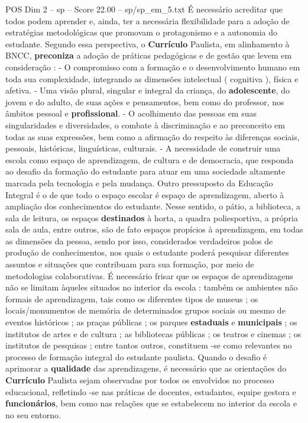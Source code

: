 \begin{textsample}{POS Dim 2 – sp – Score 22.00 – sp/sp\_em\_5.txt}
É necessário acreditar que todos podem aprender e, ainda, ter a necessária flexibilidade para a adoção de estratégias metodológicas que promovam o protagonismo e a autonomia do estudante.
Segundo essa perspectiva, o \textbf{Currículo} Paulista, em alinhamento à BNCC, \textbf{preconiza} a adoção de práticas pedagógicas e de gestão que levem em consideração : - O compromisso com a formação e o desenvolvimento humano em toda sua complexidade, integrando as dimensões intelectual ( cognitiva ), física e afetiva. - Uma visão plural, singular e integral da criança, do \textbf{adolescente}, do jovem e do adulto, de suas ações e pensamentos, bem como do professor, nos âmbitos pessoal e \textbf{profissional}. - O acolhimento das pessoas em suas singularidades e diversidades, o combate à discriminação e ao preconceito em todas as suas expressões, bem como a afirmação do respeito às diferenças sociais, pessoais, históricas, linguísticas, culturais. - A necessidade de construir uma escola como espaço de aprendizagem, de cultura e de democracia, que responda ao desafio da formação do estudante para atuar em uma sociedade altamente marcada pela tecnologia e pela mudança.
Outro pressuposto da Educação Integral é o de que todo o espaço escolar é espaço de aprendizagem, aberto à ampliação dos conhecimentos do estudante.
Nesse sentido, o pátio, a biblioteca, a sala de leitura, os espaços \textbf{destinados} à horta, a quadra poliesportiva, a própria sala de aula, entre outros, são de fato espaços propícios à aprendizagem, em todas as dimensões da pessoa, sendo por isso, considerados verdadeiros polos de produção de conhecimentos, nos quais o estudante poderá pesquisar diferentes assuntos e situações que contribuam para sua formação, por meio de metodologias colaborativas.
É necessário frisar que os espaços de aprendizagens não se limitam àqueles situados no interior da escola : também os ambientes não formais de aprendizagem, tais como os diferentes tipos de museus ; os locais/monumentos de memória de determinados grupos sociais ou mesmo de eventos históricos ; as praças públicas ; os parques \textbf{estaduais} e \textbf{municipais} ; os institutos de artes e de cultura ; as bibliotecas públicas ; os teatros e cinemas ; os institutos de pesquisas ; entre tantos outros, constituem -se como relevantes no processo de formação integral do estudante paulista.
Quando o desafio é aprimorar a \textbf{qualidade} das aprendizagens, é necessário que as orientações do \textbf{Currículo} Paulista sejam observadas por todos os envolvidos no processo educacional, refletindo -se nas práticas de docentes, estudantes, equipe gestora e \textbf{funcionários}, bem como nas relações que se estabelecem no interior da escola e no seu entorno.

\end{textsample}
